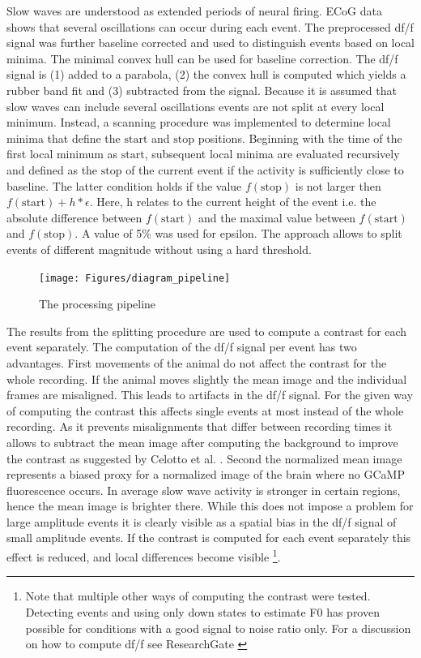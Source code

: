 Slow waves are understood as extended periods of neural firing. ECoG data shows that several oscillations can occur during each event. The preprocessed df/f signal was further baseline corrected and used to distinguish events based on local minima. The minimal convex hull can be used for baseline correction. The df/f signal is (1) added to a parabola, (2) the convex hull is computed which yields a rubber band fit and (3) subtracted from the signal. Because it is assumed that slow waves can include several oscillations events are not split at every local minimum. Instead, a scanning procedure was implemented to determine local minima that define the $\text{start}$ and $\text{stop}$ positions. Beginning with the time of the first local minimum as $\text{start}$, subsequent local minima are evaluated recursively and defined as the $\text{stop}$ of the current event if the activity is sufficiently close to baseline. The latter condition holds if the value $f(\text{stop})$ is not larger then $f(\text{start}) + h * \epsilon$. Here, h relates to the current height of the event i.e. the absolute difference between $f(\text{start})$ and the maximal value between $f(\text{start})$ and $f(\text{stop})$. A value of 5\% was used for epsilon. The approach allows to split events of different magnitude without using a hard threshold.\\
\begin{figure}[!htb]
\centering
\texttt{[image: Figures/diagram\_pipeline]}
\decoRule
\caption[The processing pipeline]{The processing pipeline}
\label{fig:diagram_pipeline}
\end{figure}
The results from the splitting procedure are used to compute a contrast for each event separately. The computation of the df/f signal per event has two advantages. First movements of the animal do not affect the contrast for the whole recording. If the animal moves slightly the mean image and the individual frames are misaligned. This leads to artifacts in the df/f signal. For the given way of computing the contrast this affects single events at most instead of the whole recording. As it prevents misalignments that differ between recording times it allows to subtract the mean image after computing the background to improve the contrast as suggested by Celotto et al. \parencite{celotto2020analysis}. Second the normalized mean image represents a biased proxy for a normalized image of the brain where no GCaMP fluorescence occurs. In average slow wave activity is stronger in certain regions, hence the mean image is brighter there. While this does not impose a problem for large amplitude events it is clearly visible as a spatial bias in the df/f signal of small amplitude events. If the contrast is computed for each event separately this effect is reduced, and local differences become visible \footnote{Note that multiple other ways of computing the contrast were tested. Detecting events and using only down states to estimate F0 has proven possible for conditions with a good signal to noise ratio only. For a discussion on how to compute df/f see ResearchGate \parencite*{researchgate2021}}.\\
